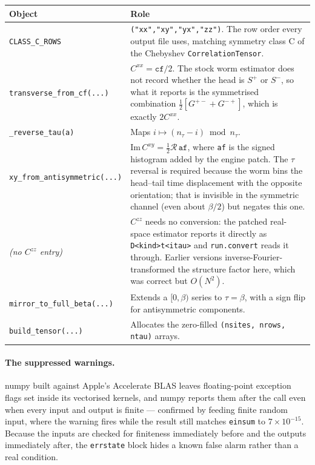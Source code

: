\documentclass[11pt,a4paper]{article}
\newcommand{\code}[1]{\texttt{#1}}
\begin{document}
\begin{longtable}{@{}p{}p{}@{}}
\toprule
Object & Role \\
\midrule
\endhead
\code{CLASS\_C\_ROWS} &
  \code{("xx","xy","yx","zz")}. The row order every output file uses, matching
  symmetry class C of the Chebyshev \code{CorrelationTensor}. \\
\code{transverse\_from\_cf(...)} &
  $C^{xx} = \code{cf}/2$. The stock worm estimator does not record whether the
  head is $S^+$ or $S^-$, so what it reports is the symmetrised combination
  $\tfrac12[G^{+-}+G^{-+}]$, which is exactly $2C^{xx}$. \\
\code{\_reverse\_tau(a)} &
  Maps $i \mapsto (n_\tau - i) \bmod n_\tau$. \\
\code{xy\_from\_antisymmetric(...)} &
  $\mathrm{Im}\,C^{xy} = \tfrac12 \mathcal{R}\,\code{af}$, where \code{af} is the
  signed histogram added by the engine patch. The $\tau$ reversal is required
  because the worm bins the head--tail time displacement with the opposite
  orientation; that is invisible in the symmetric channel (even about
  $\beta/2$) but negates this one. \\
\emph{(no $C^{zz}$ entry)} &
  $C^{zz}$ needs no conversion: the patched real-space estimator reports it
  directly as \code{D<kind>t<itau>} and \code{run.convert} reads it through.
  Earlier versions inverse-Fourier-transformed the structure factor here, which
  was correct but $O(N^2)$. \\
\code{mirror\_to\_full\_beta(...)} &
  Extends a $[0,\beta)$ series to $\tau=\beta$, with a sign flip for
  antisymmetric components. \\
\code{build\_tensor(...)} &
  Allocates the zero-filled \code{(nsites, nrows, ntau)} arrays. \\
\bottomrule
\end{longtable}

\paragraph{The suppressed warnings.} numpy built against Apple's Accelerate BLAS
leaves floating-point exception flags set inside its vectorised kernels, and
numpy reports them after the call even when every input and output is finite ---
confirmed by feeding finite random input, where the warning fires while the
result still matches \code{einsum} to $7\times10^{-15}$. Because the inputs are
checked for finiteness immediately before and the outputs immediately after, the
\code{errstate} block hides a known false alarm rather than a real condition.
\end{document}
